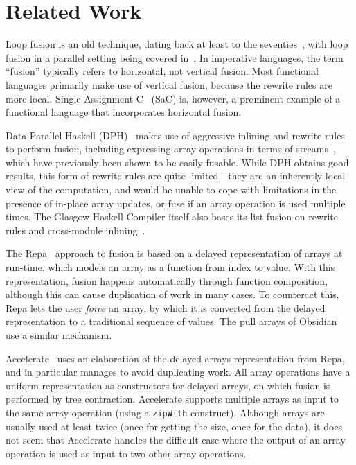 \section{Related Work}
\label{sec:related-work-fusion}

Loop fusion is an old technique, dating back at least to the
seventies~\cite{cheatham1977programming}, with loop fusion in a
parallel setting being covered in~\cite{midki1990issues}. In
imperative languages, the term ``fusion'' typically refers to
horizontal, not vertical fusion.  Most functional languages primarily
make use of vertical fusion, because the rewrite rules are more local.
Single Assignment C~\cite{grelck2006sac} (SaC) is, however, a
prominent example of a functional language that incorporates
horizontal fusion.

Data-Parallel Haskell (DPH)~\cite{Chak06DPH} makes use of aggressive
inlining and rewrite rules to perform fusion, including expressing
array operations in terms of streams~\cite{coutts2007rewriting}, which
have previously been shown to be easily fusable.  While DPH obtains
good results, this form of rewrite rules are quite limited---they are
an inherently local view of the computation, and would be unable to
cope with limitations in the presence of in-place array updates, or
fuse if an array operation is used multiple times.  The Glasgow
Haskell Compiler itself also bases its list fusion on rewrite rules
and cross-module inlining~\cite{jones2001playing}.

The Repa~\cite{keller2010regular} approach to fusion is based on a
delayed representation of arrays at run-time, which models an array as
a function from index to value.  With this representation, fusion
happens automatically through function composition, although this can
cause duplication of work in many cases.  To counteract this, Repa
lets the user \textit{force} an array, by which it is converted from
the delayed representation to a traditional sequence of values.  The
pull arrays of Obsidian~\cite{claessen2012expressive} use a similar
mechanism.

Accelerate~\cite{mcdonell2013optimising} uses an elaboration of the
delayed arrays representation from Repa, and in particular manages to
avoid duplicating work.  All array operations have a uniform
representation as constructors for delayed arrays, on which fusion is
performed by tree contraction.  Accelerate supports multiple arrays as
input to the same array operation (using a \texttt{zipWith}
construct).  Although arrays are usually used at least twice (once for
getting the size, once for the data), it does not seem that Accelerate
handles the difficult case where the output of an array operation is
used as input to two other array operations.

